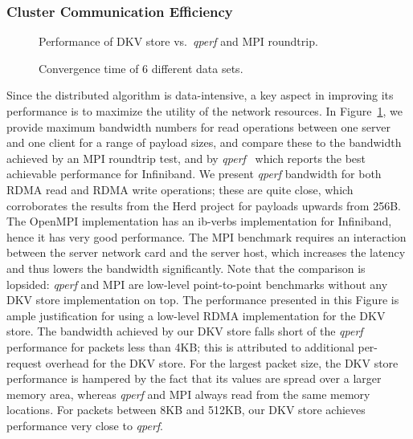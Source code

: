 \subsubsection{Cluster Communication Efficiency}

\begin{figure}[tb] %
  \centering
  \caption{Performance of DKV store vs.\ \textit{qperf} and MPI roundtrip.}
  \label{fig-qperf}
\end{figure}

\begin{figure*}[htbp] %
  \centering
  \caption{Convergence time of 6 different data sets.}
  \label{fig-ppx}
\end{figure*}

Since the distributed algorithm is data-intensive, a key aspect in improving
its performance is to maximize the utility of the network resources.
In Figure~\ref{fig-qperf}, we provide maximum bandwidth numbers for
read operations between one server and one client for a range of payload sizes,
and compare these to the bandwidth achieved by an MPI roundtrip test,
and by \textit{qperf}~\cite{qperf-mellanox} which reports
the best achievable performance for Infiniband. We present \textit{qperf}
bandwidth for both RDMA read and RDMA write operations; these are quite
close, which corroborates the results from the Herd project for payloads
upwards from 256B.
The OpenMPI implementation has an ib-verbs implementation for Infiniband,
hence it has very good performance.
The MPI benchmark requires an interaction between
the server network card and the server host, which increases the latency and
thus lowers the bandwidth
significantly.
Note that the comparison is
lopsided: \textit{qperf} and MPI are low-level point-to-point benchmarks without
any DKV store implementation on top.
The performance presented in this Figure
is ample justification for using a low-level RDMA
implementation for the DKV store.
The bandwidth achieved by our DKV store falls short
of the \textit{qperf} performance for packets less than 4KB; this is attributed
to additional per-request overhead for the DKV store. For the largest packet
size, the DKV store performance is hampered by the fact that its values
are spread over a larger memory area, whereas \textit{qperf} and MPI always read
from the same memory locations. For packets between 8KB and 512KB, our DKV
store achieves performance very close to \textit{qperf}.

